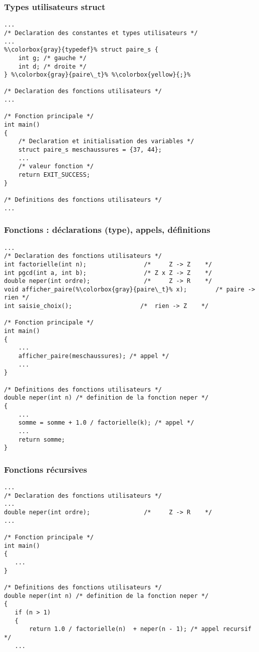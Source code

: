 \documentclass[xcolor=svgnames]{beamer}
\begin{document}
\begin{frame}[fragile]
  \frametitle{Types utilisateurs struct}

\begin{lstlisting}[basicstyle=\ttfamily\scriptsize,escapechar={\%}] 
...
/* Declaration des constantes et types utilisateurs */
...
%\colorbox{gray}{typedef}% struct paire_s {
    int g; /* gauche */
    int d; /* droite */
} %\colorbox{gray}{paire\_t}% %\colorbox{yellow}{;}%

/* Declaration des fonctions utilisateurs */
...

/* Fonction principale */
int main()
{
    /* Declaration et initialisation des variables */
    struct paire_s meschaussures = {37, 44};
    ...
    /* valeur fonction */
    return EXIT_SUCCESS;
}

/* Definitions des fonctions utilisateurs */
...
\end{lstlisting}
\end{frame}
\begin{frame}[fragile]
\frametitle{Fonctions : déclarations (type), appels, définitions}

\begin{lstlisting}[basicstyle=\ttfamily\scriptsize,escapechar={\%}] 
...
/* Declaration des fonctions utilisateurs */
int factorielle(int n);                /*     Z -> Z    */
int pgcd(int a, int b);                /* Z x Z -> Z    */ 
double neper(int ordre);               /*     Z -> R    */
void afficher_paire(%\colorbox{gray}{paire\_t}% x);        /* paire -> rien */
int saisie_choix();                   /*  rien -> Z    */

/* Fonction principale */
int main() 
{
    ...
    afficher_paire(meschaussures); /* appel */
    ...
}

/* Definitions des fonctions utilisateurs */
double neper(int n) /* definition de la fonction neper */
{
    ...
    somme = somme + 1.0 / factorielle(k); /* appel */
    ...
    return somme;
}
\end{lstlisting}
\end{frame}

\begin{frame}[fragile]
  \frametitle{Fonctions récursives}

\begin{lstlisting}[basicstyle=\ttfamily\scriptsize,escapechar={\%}] 
...
/* Declaration des fonctions utilisateurs */
...
double neper(int ordre);               /*     Z -> R    */
...

/* Fonction principale */
int main()
{
   ...
}

/* Definitions des fonctions utilisateurs */
double neper(int n) /* definition de la fonction neper */
{
   if (n > 1)
   {
       return 1.0 / factorielle(n)  + neper(n - 1); /* appel recursif */
   ...
\end{lstlisting}
\end{frame}
\end{document}
